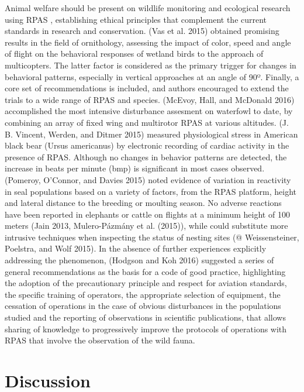 \documentclass[]{interact}
\theoremstyle{plain}%
\theoremstyle{definition}
\theoremstyle{remark}
\begin{document}
Animal welfare should be present on wildlife monitoring and ecological
research using RPAS , establishing ethical principles that complement
the current standards in research and conservation. (Vas et al. 2015)
obtained promising results in the field of ornithology, assessing the
impact of color, speed and angle of flight on the behavioral responses
of wetland birds to the approach of multicopters. The latter factor is
considered as the primary trigger for changes in behavioral patterns,
especially in vertical approaches at an angle of 90º. Finally, a core
set of recommendations is included, and authors encouraged to extend the
trials to a wide range of RPAS and species. (McEvoy, Hall, and McDonald
2016) accomplished the most intensive disturbance assesment on waterfowl
to date, by combining an array of fixed wing and multirotor RPAS at
various altitudes. (J. B. Vincent, Werden, and Ditmer 2015) measured
physiological stress in American black bear (Ursus americanus) by
electronic recording of cardiac activity in the presence of RPAS.
Although no changes in behavior patterns are detected, the increase in
beats per minute (bmp) is significant in most cases observed. (Pomeroy,
O'Connor, and Davies 2015) noted evidence of variation in reactivity in
seal populations based on a variety of factors, from the RPAS platform,
height and lateral distance to the breeding or moulting season. No
adverse reactions have been reported in elephants or cattle on flights
at a minimum height of 100 meters (Jain 2013, Mulero-Pázmány et al.
(2015)), while could substitute more intrusive techniques when
inspecting the status of nesting sites (@ Weissensteiner, Poelstra, and
Wolf 2015). In the absence of further experiences explicitly addressing
the phenomenon, (Hodgson and Koh 2016) suggested a series of general
recommendations as the basis for a code of good practice, highlighting
the adoption of the precautionary principle and respect for aviation
standards, the specific training of operators, the appropriate selection
of equipment, the cessation of operations in the case of obvious
disturbances in the populations studied and the reporting of
observations in scientific publications, that allows sharing of
knowledge to progressively improve the protocols of operations with RPAS
that involve the observation of the wild fauna.

\section{Discussion}\label{discussion}
\end{document}

